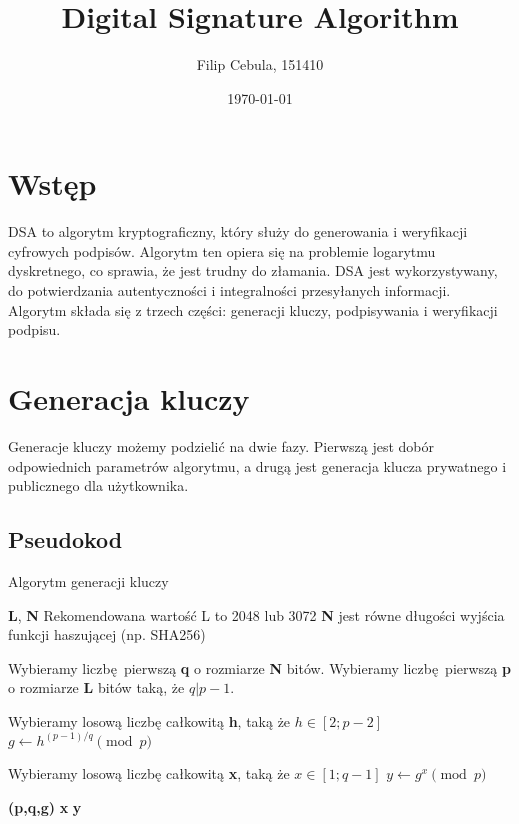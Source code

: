 \documentclass[11pt]{article}
\title{Digital Signature Algorithm}
\author{Filip Cebula, 151410}
\date{\today}
\begin{document}
\maketitle
\pagebreak

\section{Wstęp}
DSA to algorytm kryptograficzny, który służy do generowania i weryfikacji
cyfrowych podpisów. Algorytm ten opiera się na problemie logarytmu
dyskretnego, co sprawia, że jest trudny do złamania. DSA jest
wykorzystywany, do potwierdzania autentyczności i integralności przesyłanych
informacji. Algorytm składa się z trzech części: generacji kluczy, podpisywania
i weryfikacji podpisu.

\section{Generacja kluczy}
Generacje kluczy możemy podzielić na dwie fazy. Pierwszą jest dobór
odpowiednich parametrów algorytmu, a drugą jest generacja klucza prywatnego
i publicznego dla użytkownika.

\subsection{Pseudokod}
\begin{algorithm}
\caption{Algorytm generacji kluczy}\label{alg:cap}
  \begin{algorithmic}[1]
    \Require \textbf{L}, \textbf{N}
    \Comment Rekomendowana wartość L to 2048 lub 3072
    \Ensure \textbf{N} jest równe długości wyjścia funkcji haszującej
      (np. SHA256)

    \State Wybieramy liczbę pierwszą \textbf{q} o rozmiarze \textbf{N} bitów.
    \State Wybieramy liczbę pierwszą \textbf{p} o rozmiarze \textbf{L} bitów
      taką, że $q|p-1$.

    \Repeat
      \State Wybieramy losową liczbę całkowitą \textbf{h}, taką że $h \in [2;p-2]$
      \State $g \gets h^{(p-1)/q} \pmod p$

    \State Wybieramy losową liczbę całkowitą \textbf{x}, taką że $x \in [1;q-1]$
    \State $y \gets g^{x} \pmod p$

    \State \Return \textbf{(p,q,g)}
    \State \Return \textbf{x}
    \State \Return \textbf{y}
  \end{algorithmic}
\end{algorithm}
\end{document}
